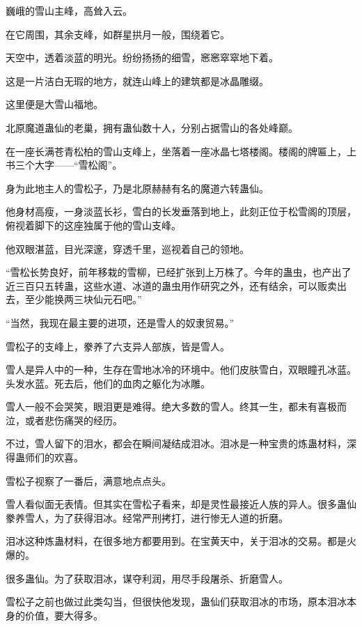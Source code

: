 
\begin{this_body}

巍峨的雪山主峰，高耸入云。

在它周围，其余支峰，如群星拱月一般，围绕着它。

天空中，透着淡蓝的明光。纷纷扬扬的细雪，窸窸窣窣地下着。

这是一片洁白无瑕的地方，就连山峰上的建筑都是冰晶雕缀。

这里便是大雪山福地。

北原魔道蛊仙的老巢，拥有蛊仙数十人，分别占据雪山的各处峰巅。

在一座长满苍青松柏的雪山支峰上，坐落着一座冰晶七塔楼阁。楼阁的牌匾上，上书三个大字——“雪松阁”。

身为此地主人的雪松子，乃是北原赫赫有名的魔道六转蛊仙。

他身材高瘦，一身淡蓝长衫，雪白的长发垂落到地上，此刻正位于松雪阁的顶层，俯视着脚下的这座独属于他的雪山支峰。

他双眼湛蓝，目光深邃，穿透千里，巡视着自己的领地。

“雪松长势良好，前年移栽的雪柳，已经扩张到上万株了。今年的蛊虫，也产出了近三百只五转蛊，这些水道、冰道的蛊虫用作研究之外，还有结余，可以贩卖出去，至少能换两三块仙元石吧。”

“当然，我现在最主要的进项，还是雪人的奴隶贸易。”

雪松子的支峰上，豢养了六支异人部族，皆是雪人。

雪人是异人中的一种，生存在雪地冰冷的环境中。他们皮肤雪白，双眼瞳孔冰蓝。头发水蓝。死去后，他们的血肉之躯化为冰雕。

雪人一般不会哭笑，眼泪更是难得。绝大多数的雪人。终其一生，都未有喜极而泣，或者悲伤痛哭的经历。

不过，雪人留下的泪水，都会在瞬间凝结成泪冰。泪冰是一种宝贵的炼蛊材料，深得蛊师们的欢喜。

雪松子视察了一番后，满意地点点头。

雪人看似面无表情。但其实在雪松子看来，却是灵性最接近人族的异人。很多蛊仙豢养雪人，为了获得泪冰。经常严刑拷打，进行惨无人道的折磨。

泪冰这种炼蛊材料，在很多地方都要用到。在宝黄天中，关于泪冰的交易。都是火爆的。

很多蛊仙。为了获取泪冰，谋夺利润，用尽手段屠杀、折磨雪人。

雪松子之前也做过此类勾当，但很快他发现，蛊仙们获取泪冰的市场，原本泪冰本身的价值，要大得多。


\end{this_body}
